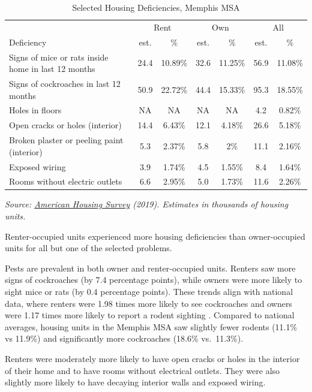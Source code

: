\documentclass[
]{book}
\begin{document}
\begin{table}

\caption{\label{tab:tbl-AHSselfdef}Selected Housing Deficiencies, Memphis MSA}
\centering
\begin{tabular}[t]{l|c|c|c|c|c|c}
\hline
\multicolumn{1}{c|}{ } & \multicolumn{2}{c|}{Rent} & \multicolumn{2}{c|}{Own} & \multicolumn{2}{c}{All} \\
\cline{2-3} \cline{4-5} \cline{6-7}
Deficiency & est. & \% & est. & \% & est. & \%\\
\hline
Signs of mice or rats inside home in last 12 months & 24.4 & 10.89\% & 32.6 & 11.25\% & 56.9 & 11.08\%\\
\hline
Signs of cockroaches in last 12 months & 50.9 & 22.72\% & 44.4 & 15.33\% & 95.3 & 18.55\%\\
\hline
Holes in floors & NA & NA & NA & NA & 4.2 & 0.82\%\\
\hline
Open cracks or holes (interior) & 14.4 & 6.43\% & 12.1 & 4.18\% & 26.6 & 5.18\%\\
\hline
Broken plaster or peeling paint (interior) & 5.3 & 2.37\% & 5.8 & 2\% & 11.1 & 2.16\%\\
\hline
Exposed wiring & 3.9 & 1.74\% & 4.5 & 1.55\% & 8.4 & 1.64\%\\
\hline
Rooms without electric outlets & 6.6 & 2.95\% & 5.0 & 1.73\% & 11.6 & 2.26\%\\
\hline
\end{tabular}
\end{table}

\emph{Source: \href{https://www.census.gov/newsroom/press-releases/2020/2019-american-housing-survey.html}{American Housing Survey} (2019). Estimates in thousands of housing units.}

Renter-occupied units experienced more housing deficiencies than owner-occupied units for all but one of the selected problems.

Pests are prevalent in both owner and renter-occupied units. Renters saw more signs of cockroaches (by 7.4 percentage points), while owners were more likely to sight mice or rats (by 0.4 percentage points). These trends align with national data, where renters were 1.98 times more likely to see cockroaches and owners were 1.17 times more likely to report a rodent sighting \citep{sellner2021}. Compared to national averages, housing units in the Memphis MSA saw slightly fewer rodents (11.1\% vs 11.9\%) and significantly more cockroaches (18.6\% vs.~11.3\%).

Renters were moderately more likely to have open cracks or holes in the interior of their home and to have rooms without electrical outlets. They were also slightly more likely to have decaying interior walls and exposed wiring.
\end{document}
